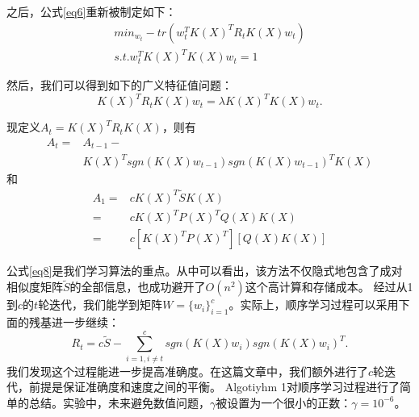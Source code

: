 \documentclass{article}
\begin{document}
之后，公式\ref{eq6}重新被制定如下：
\begin{equation}
\begin{split}
min_{w_t}-tr(w^T_tK(X)^TR_tK(X)w_t)\\
s.t.w^T_tK(X)^TK(X)w_t=1
\label{eq7}
\end{split}
\end{equation}


然后，我们可以得到如下的广义特征值问题：
\begin{equation*}
K(X)^TR_tK(X)w_t= \lambda K(X)^TK(X)w_t.
\end{equation*}

现定义$A_t=K(X)^TR_tK(X)$，则有
\begin{equation*}
\begin{split}
A_t=& A_{t-1}-\\
&K(X)^Tsgn(K(X)w_{t-1})sgn(K(X)w_{t-1})^TK(X)
\end{split}
\end{equation*}
和
\begin{equation}
\begin{split}
A_1=&cK(X)^T\tilde{S}K(X)\\
   =&cK(X)^TP(X)^TQ(X)K(X)\\    
   =&c[K(X)^TP(X)^T][Q(X)K(X)]
\label{eq8}
\end{split}
\end{equation}

公式\ref{eq8}是我们学习算法的重点。从中可以看出，该方法不仅隐式地包含了成对相似度矩阵$\tilde{S}$的全部信息，也成功避开了$O(n^2)$这个高计算和存储成本。
经过从1到$c$的$t$轮迭代，我们能学到矩阵$W=\{w_i\}^c_{i=1}$。实际上，顺序学习过程可以采用下面的残基进一步继续：
\begin{equation*}
R_t=c\tilde{S}-\sum^c_{i=1,i\neq t}sgn(K(X)w_i)sgn(K(X)w_i)^T.
\end{equation*}
我们发现这个过程能进一步提高准确度。在这篇文章中，我们额外进行了$c$轮迭代，前提是保证准确度和速度之间的平衡。
Algotiyhm 1对顺序学习过程进行了简单的总结。实验中，未来避免数值问题，$\gamma$被设置为一个很小的正数：$\gamma =10^{-6}$。
\end{document}
